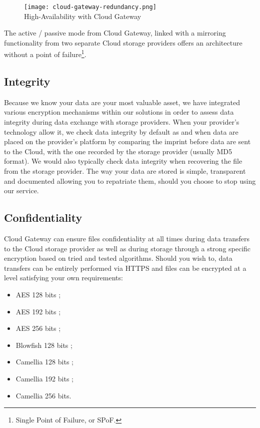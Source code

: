 \documentclass[11pt,fleqn,openany]{book} %
\begin{document}
\begin{figure}[H]
\centering
\texttt{[image: cloud-gateway-redundancy.png]}\\
High-Availability with Cloud Gateway
\end{figure}

The active / passive mode from Cloud Gateway, linked with a mirroring functionality from two separate Cloud storage providers offers an architecture without a point of failure\footnote{Single Point of Failure, or SPoF.}.

\subsection{Integrity}

Because we know your data are your most valuable asset, we have integrated various encryption mechanisms within our solutions in order to assess data integrity during data exchange with storage providers. When your provider’s technology allow it, we check data integrity by default as and when data are placed on the provider’s platform by comparing the imprint before data are sent to the Cloud, with the one recorded by the storage provider (usually MD5 format). We would also typically check data integrity when recovering the file from the storage provider.
The way your data are stored is simple, transparent and documented allowing you to repatriate them, should you choose to stop using our service.

\subsection{Confidentiality}

Cloud Gateway can ensure files confidentiality at all times during data transfers to the Cloud storage provider as well as during storage through a strong specific encryption based on tried and tested algorithms. Should you wish to, data transfers can be entirely performed via HTTPS and files can be encrypted at a level satisfying your own requirements:\\
\begin{itemize}
\item AES 128 bits ;
\item AES 192 bits ;
\item AES 256 bits ;
\item Blowfish 128 bits ;
\item Camellia 128 bits ;
\item Camellia 192 bits ;
\item Camellia 256 bits.\\
\end{itemize}
\end{document}
